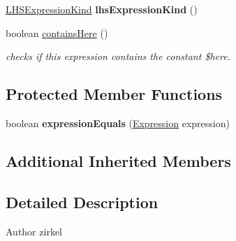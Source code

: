 \begin{DoxyCompactItemize}
\item 
\hypertarget{classedu_1_1udel_1_1cis_1_1vsl_1_1civl_1_1model_1_1common_1_1expression_1_1CommonDotExpression_a89faf3b0b5d01642c2b622fbdefae82c}{}\hyperlink{enumedu_1_1udel_1_1cis_1_1vsl_1_1civl_1_1model_1_1IF_1_1expression_1_1LHSExpression_1_1LHSExpressionKind}{L\+H\+S\+Expression\+Kind} {\bfseries lhs\+Expression\+Kind} ()\label{classedu_1_1udel_1_1cis_1_1vsl_1_1civl_1_1model_1_1common_1_1expression_1_1CommonDotExpression_a89faf3b0b5d01642c2b622fbdefae82c}

\item 
boolean \hyperlink{classedu_1_1udel_1_1cis_1_1vsl_1_1civl_1_1model_1_1common_1_1expression_1_1CommonDotExpression_ae9315f2ad02dda1de9f3d2282b36bc65}{contains\+Here} ()
\begin{DoxyCompactList}\small\item\em checks if this expression contains the constant \$here. \end{DoxyCompactList}\end{DoxyCompactItemize}
\subsection*{Protected Member Functions}
\begin{DoxyCompactItemize}
\item 
\hypertarget{classedu_1_1udel_1_1cis_1_1vsl_1_1civl_1_1model_1_1common_1_1expression_1_1CommonDotExpression_ab3e4e69ec5a8a4a2abc65aec5a1df928}{}boolean {\bfseries expression\+Equals} (\hyperlink{interfaceedu_1_1udel_1_1cis_1_1vsl_1_1civl_1_1model_1_1IF_1_1expression_1_1Expression}{Expression} expression)\label{classedu_1_1udel_1_1cis_1_1vsl_1_1civl_1_1model_1_1common_1_1expression_1_1CommonDotExpression_ab3e4e69ec5a8a4a2abc65aec5a1df928}

\end{DoxyCompactItemize}
\subsection*{Additional Inherited Members}


\subsection{Detailed Description}
\begin{DoxyAuthor}{Author}
zirkel 
\end{DoxyAuthor}


